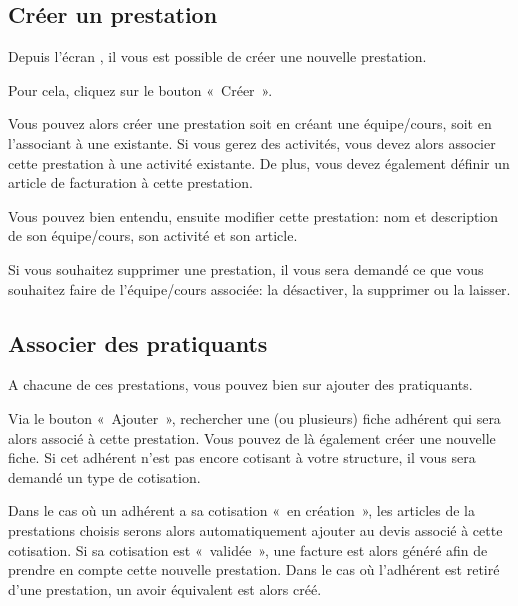 \documentclass[a4paper,10pt,oneside,french]{sphinxmanual}
\begin{document}
\subsection{Créer un prestation}
\label{\detokenize{member/prestation:creer-un-prestation}}
\sphinxAtStartPar
Depuis l’écran , il vous est possible de créer une nouvelle prestation.

\sphinxAtStartPar
Pour cela, cliquez sur le bouton « Créer ».
\begin{quote}

\noindent{}
\end{quote}

\sphinxAtStartPar
Vous pouvez alors créer une prestation soit en créant une équipe/cours, soit en l’associant à une existante.
Si vous gerez des activités, vous devez alors associer cette prestation à une activité existante.
De plus, vous devez également définir un article de facturation à cette prestation.

\sphinxAtStartPar
Vous pouvez bien entendu, ensuite modifier cette prestation: nom et description de son équipe/cours, son activité et son article.

\sphinxAtStartPar
Si vous souhaitez supprimer une prestation, il vous sera demandé ce que vous souhaitez faire de l’équipe/cours associée: la désactiver, la supprimer ou la laisser.


\subsection{Associer des pratiquants}
\label{\detokenize{member/prestation:associer-des-pratiquants}}
\sphinxAtStartPar
A chacune de ces prestations, vous pouvez bien sur ajouter des pratiquants.
\begin{quote}

\noindent{}
\end{quote}

\sphinxAtStartPar
Via le bouton « Ajouter », rechercher une (ou plusieurs) fiche adhérent qui sera alors associé à cette prestation.
Vous pouvez de là également créer une nouvelle fiche.
Si cet adhérent n’est pas encore cotisant à votre structure, il vous sera demandé un type de cotisation.

\sphinxAtStartPar
Dans le cas où un adhérent a sa cotisation « en création », les articles de la prestations choisis serons alors automatiquement ajouter au devis associé à cette cotisation.
Si sa cotisation est « validée », une facture est alors généré afin de prendre en compte cette nouvelle prestation.
Dans le cas où l’adhérent est retiré d’une prestation, un avoir équivalent est alors créé.
\end{document}
